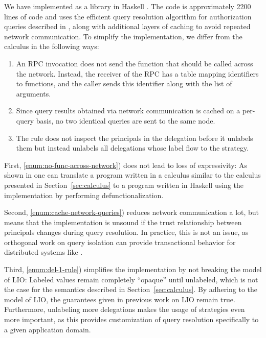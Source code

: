 We have implemented \lang{} as a library in Haskell \cite{flamiolib}. The code is approximately 2200 lines of code and uses the efficient query resolution algorithm for authorization queries described in \cite{Arden:2015:FA:2859845.2859998}, along with additional layers of caching to avoid repeated network communication. To simplify the implementation, we differ from the calculus in the following ways:
\begin{enumerate}
    \item \label{enum:no-func-across-network} An RPC invocation does not send the function that should be called across the network. Instead, the receiver of the RPC has a table mapping identifiers to functions, and the caller sends this identifier along with the list of arguments.
    \item \label{enum:cache-network-queries} Since query results obtained via network communication is cached on a per-query basis, no two identical queries are sent to the same node.
    \item \label{enum:del-1-rule} The  rule does not inspect the principals in the delegation before it unlabels them but instead unlabels all delegations whose label flow to the strategy.
\end{enumerate}

First, \ref{enum:no-func-across-network}) does not lead to loss of expressivity: As shown in \cite{Cooper:2009:RC:1599410.1599439} one can translate a program written in a calculus similar to the calculus presented in Section~\ref{sec:calculus} to a program written in Haskell using the \lang{} implementation by performing defunctionalization.

Second, \ref{enum:cache-network-queries}) reduces network communication a lot, but means that the implementation is unsound if the trust relationship between principals changes during query resolution. In practice, this is not an issue, as orthogonal work on query isolation \cite{Liu:2009:FPS:1629575.1629606} can provide transactional behavior for distributed systems like \lang.

Third, \ref{enum:del-1-rule}) simplifies the implementation by not breaking the model of LIO: Labeled values remain completely ``opaque'' until unlabeled, which is not the case for the semantics described in Section~\ref{sec:calculus}. By adhering to the model of LIO, the guarantees given in previous work on LIO \cite{SRMMlio} remain true. Furthermore, unlabeling more delegations makes the usage of strategies even more important, as this provides customization of query resolution specifically to a given application domain.


